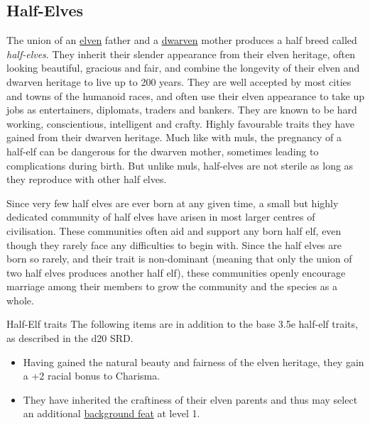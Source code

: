 \subsection{Half-Elves}
\label{sec:Half-Elves}

The union of an \hyperref[sec:Elves]{elven} father and a
\hyperref[sec:Dwarves]{dwarven} mother produces a half breed called
\emph{half-elves}. They inherit their slender appearance from their elven
heritage, often looking beautiful, gracious and fair, and combine the
longevity of their elven and dwarven heritage to live up to 200 years. They
are well accepted by most cities and towns of the humanoid races, and often
use their elven appearance to take up jobs as entertainers, diplomats, traders
and bankers. They are known to be hard working, conscientious, intelligent and
crafty. Highly favourable traits they have gained from their dwarven
heritage. Much like with muls, the pregnancy of a half-elf can be dangerous
for the dwarven mother, sometimes leading to complications during birth. But
unlike muls, half-elves are not sterile as long as they reproduce with other
half elves.

Since very few half elves are ever born at any given time, a small but highly
dedicated community of half elves have arisen in most larger centres of
civilisation. These communities often aid and support any born half elf, even
though they rarely face any difficulties to begin with. Since the half elves
are born so rarely, and their trait is non-dominant (meaning that only the
union of two half elves produces another half elf), these communities openly
encourage marriage among their members to grow the community and the species
as a whole.

\begin{35e}{Half-Elf traits}
  The following items are in addition to the base 3.5e half-elf traits, as
  described in the d20 SRD.
  \begin{itemize}[noitemsep]
  \item Having gained the natural beauty and fairness of the elven heritage,
    they gain a +2 racial bonus to Charisma.
  \item They have inherited the craftiness of their elven parents and thus
    may select an additional \hyperref[sec:Background Feats]{background feat}
    at level 1.
  \end{itemize}
\end{35e}
